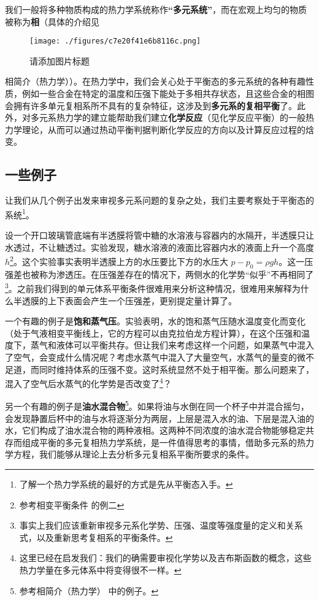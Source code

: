 
我们一般将多种物质构成的热力学系统称作\textbf{“多元系统”}，而在宏观上均匀的物质被称为\textbf{相}（具体的介绍见\begin{figure}[ht]
\centering
\texttt{[image: ./figures/c7e20f41e6b8116c.png]}
\caption{请添加图片标题} \label{fig_mulTh_1}
\end{figure}
相简介（热力学））。在热力学中，我们会关心处于平衡态的多元系统的各种有趣性质，例如一些合金在特定的温度和压强下能处于多相共存状态，且这些合金的相图会拥有许多单元复相系所不具有的复杂特征，这涉及到\textbf{多元系的复相平衡}了。此外，对多元系热力学的建立能帮助我们建立\textbf{化学反应}（见化学反应平衡）的一般热力学理论，从而可以通过热动平衡判据判断化学反应的方向以及计算反应过程的焓变。
\subsection{一些例子}
让我们从几个例子出发来审视多元系问题的复杂之处，我们主要考察处于平衡态的系统\footnote{了解一个热力学系统的最好的方式是先从平衡态入手。}。

设一个开口玻璃管底端有半透膜将管中糖的水溶液与容器内的水隔开，半透膜只让水透过，不让糖透过。实验发现，糖水溶液的液面比容器内水的液面上升一个高度 $h$\footnote{参考相变平衡条件 的例二}。这个实验事实表明半透膜上方的水压要比下方的水压大 $p-p_0=\rho g h$。这一压强差也被称为渗透压。在压强差存在的情况下，两侧水的化学势“似乎”不再相同了\footnote{事实上我们应该重新审视多元系化学势、压强、温度等强度量的定义和关系式，以及重新思考复相系的平衡条件。}。之前我们得到的单元体系平衡条件很难用来分析这种情况，很难用来解释为什么半透膜的上下表面会产生一个压强差，更别提定量计算了。

一个有趣的例子是\textbf{饱和蒸气压}。实验表明，水的饱和蒸气压随水温度变化而变化（处于气液相变平衡线上，它的方程可以由克拉伯龙方程计算），在这个压强和温度下，蒸气和液体可以平衡共存。但让我们来考虑这样一个问题，如果蒸气中混入了空气，会变成什么情况呢？考虑水蒸气中混入了大量空气，水蒸气的量变的微不足道，而同时维持体系的压强不变。这时系统显然不处于相平衡。那么问题来了，混入了空气后水蒸气的化学势是否改变了\footnote{这里已经在启发我们：我们的确需要审视化学势以及吉布斯函数的概念，这些热力学量在多元体系中将变得很不一样。}？

另一个有趣的例子是\textbf{油水混合物}\footnote{参考相简介（热力学） 中的例子。}。如果将油与水倒在同一个杯子中并混合摇匀，会发现静置后杯中的油与水将逐渐分为两层，上层是混入水的油、下层是混入油的水，它们构成了油水混合物的两种液相。这两种不同浓度的油水混合物能够稳定共存而组成平衡的多元复相热力学系统，是一件值得思考的事情，借助多元系的热力学方程，我们能够从理论上去分析多元复相系平衡所要求的条件。

